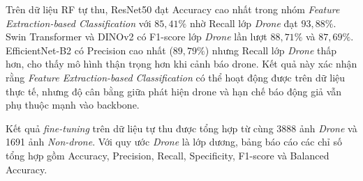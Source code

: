 \documentclass[../DoAn.tex]{subfiles}
\begin{document}
Trên dữ liệu RF tự thu, ResNet50 đạt Accuracy cao nhất trong nhóm \textit{Feature Extraction-based Classification} với $85{,}41\%$ nhờ Recall lớp \textit{Drone} đạt $93{,}88\%$. Swin Transformer và DINOv2 có F1-score lớp \textit{Drone} lần lượt $88{,}71\%$ và $87{,}69\%$. EfficientNet-B2 có Precision cao nhất ($89{,}79\%$) nhưng Recall lớp \textit{Drone} thấp hơn, cho thấy mô hình thận trọng hơn khi cảnh báo drone. Kết quả này xác nhận rằng \textit{Feature Extraction-based Classification} có thể hoạt động được trên dữ liệu thực tế, nhưng độ cân bằng giữa phát hiện drone và hạn chế báo động giả vẫn phụ thuộc mạnh vào backbone.

Kết quả \textit{fine-tuning} trên dữ liệu tự thu được tổng hợp từ cùng 3888 ảnh \textit{Drone} và 1691 ảnh \textit{Non-drone}. Với quy ước \textit{Drone} là lớp dương, bảng báo cáo các chỉ số tổng hợp gồm Accuracy, Precision, Recall, Specificity, F1-score và Balanced Accuracy.

\begin{table}[H]
    \centering
    \renewcommand{\arraystretch}{1.25}
    \scriptsize
    \setlength{\tabcolsep}{2pt}
    \caption{Kết quả \textit{fine-tuning} trên dữ liệu RF tự thu}
    \label{tab:finetune_self_collected}
\end{table}
\end{document}
